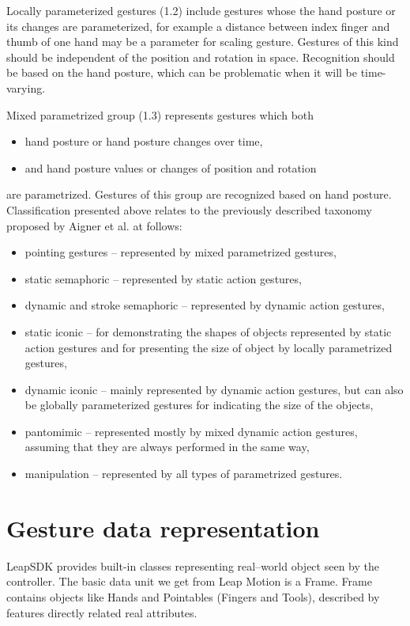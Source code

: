 Locally parameterized gestures (1.2) include gestures whose the hand posture or its changes are parameterized, for example a distance between index finger and thumb of one hand may be a parameter for scaling gesture. Gestures of this kind should be independent of the position and rotation in space. Recognition should be based on the hand posture, which can be problematic when it will be time-varying.

Mixed parametrized group (1.3) represents gestures which both
\begin{itemize}
\item hand posture or hand posture changes over time,
\item and hand posture values or changes of position and rotation
\end{itemize}
are parametrized. Gestures of this group are recognized based on hand posture.
Classification presented above relates to the previously described taxonomy proposed by Aigner et al. at follows:
\begin{itemize}
\item pointing gestures -- represented by mixed parametrized gestures,
\item static semaphoric -- represented by static action gestures,
\item dynamic and stroke semaphoric -- represented by dynamic action gestures,
\item static iconic -- for demonstrating the shapes of objects represented by static action gestures and for presenting the size of object by locally parametrized gestures,
\item dynamic iconic -- mainly represented by dynamic action gestures, but can also be globally parameterized gestures for indicating the size of the objects,
\item pantomimic -- represented mostly by mixed dynamic action gestures, assuming that they are always performed in the same way,
\item manipulation -- represented by all types of parametrized gestures.
\end{itemize}



\section{Gesture data representation}

LeapSDK provides built-in classes representing real--world object seen by the controller. The basic data unit we get from Leap Motion is a Frame. Frame contains objects like Hands and Pointables (Fingers and Tools), described by features directly related real attributes.

